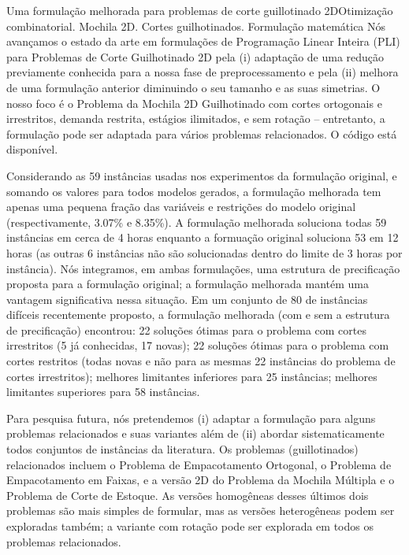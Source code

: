 \documentclass[ppgc,prop-tese,english,formais,babel]{iiufrgs}
\begin{document}
\begin{englishabstract}{Uma formulação melhorada para problemas de corte guillotinado 2D}{Otimização combinatorial. Mochila 2D. Cortes guilhotinados. Formulação matemática}
Nós avançamos o estado da arte em formulações de Programação Linear Inteira (PLI) para Problemas de Corte Guilhotinado 2D pela (i) adaptação de uma redução previamente conhecida para a nossa fase de preprocessamento e pela (ii) melhora de uma formulação anterior diminuindo o seu tamanho e as suas simetrias.
O nosso foco é o Problema da Mochila 2D Guilhotinado com cortes ortogonais e irrestritos, demanda restrita, estágios ilimitados, e sem rotação -- entretanto, a formulação pode ser adaptada para vários problemas relacionados.
O código está disponível.

Considerando as 59 instâncias usadas nos experimentos da formulação original, e somando os valores para todos modelos gerados, a formulação melhorada tem apenas uma pequena fração das variáveis e restrições do modelo original (respectivamente, 3.07\% e 8.35\%).
A formulação melhorada soluciona todas 59 instâncias em cerca de 4 horas enquanto a formuação original soluciona 53 em 12 horas (as outras 6 instâncias não são solucionadas dentro do limite de 3 horas por instância).
Nós integramos, em ambas formulações, uma estrutura de precificação proposta para a formulação original; a formulação melhorada mantém uma vantagem significativa nessa situação.
Em um conjunto de 80 de instâncias difíceis recentemente proposto, a formulação melhorada (com e sem a estrutura de precificação) encontrou: 22 soluções ótimas para o problema com cortes irrestritos (5 já conhecidas, 17 novas); 22 soluções ótimas para o problema com cortes restritos (todas novas e não para as mesmas 22 instâncias do problema de cortes irrestritos); melhores limitantes inferiores para 25 instâncias; melhores limitantes superiores para 58 instâncias.

Para pesquisa futura, nós pretendemos (i) adaptar a formulação para alguns problemas relacionados e suas variantes além de (ii) abordar sistematicamente todos conjuntos de instâncias da literatura.
Os problemas (guillotinados) relacionados incluem o Problema de Empacotamento Ortogonal, o Problema de Empacotamento em Faixas, e a versão 2D do Problema da Mochila Múltipla e o Problema de Corte de Estoque.
As versões homogêneas desses últimos dois problemas são mais simples de formular, mas as versões heterogêneas podem ser exploradas também; a variante com rotação pode ser explorada em todos os problemas relacionados.
\end{englishabstract}
\end{document}
